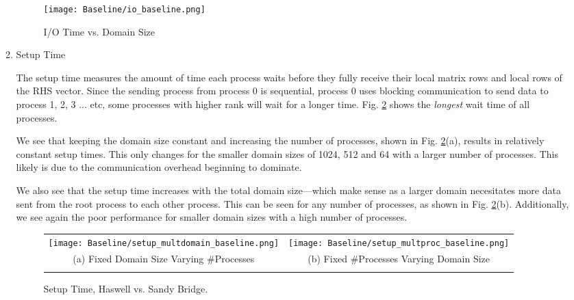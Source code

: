\begin{enumerate}
\begin{enumerate}
	
 \begin{figure}[h] %
 	\begin{center}
  		\texttt{[image: Baseline/io\_baseline.png]} %
  		\caption{I/O Time vs. Domain Size}
  		\label{fig:IO}
  	\end{center}
 \end{figure}

	\item Setup Time

	The setup time measures the amount of time each process waits before they fully receive their local matrix rows and local rows of the RHS vector. Since the sending process from process 0 is sequential, process 0 uses blocking communication to send data to process 1, 2, 3 ... etc, some processes with higher rank will wait for a longer time. Fig. \ref{fig:setup} shows the \textit{longest} wait time of all processes. 
	
	We see that keeping the domain size constant and increasing the number of processes, shown in Fig. \ref{fig:setup}(a), results in relatively constant setup times. This only changes for the smaller domain sizes of 1024, 512 and 64 with a larger number of processes. This likely is due to the communication overhead beginning to dominate.
	
 We also see that the setup time increases with the total domain size---which make sense as a larger domain necesitates more data sent from the root process to each other process. This can be seen for any number of processes, as shown in Fig. \ref{fig:setup}(b). Additionally, we see again the poor performance for smaller domain sizes with a high number of processes.
	
	
	\begin{figure}[h] %
		\begin{tabular}{cc}
			\hspace*{-0.35\linewidth}\texttt{[image: Baseline/setup\_multdomain\_baseline.png]} & \hspace*{-0.05\linewidth}\texttt{[image: Baseline/setup\_multproc\_baseline.png]} \\
		    \hspace*{-0.45\linewidth}(a) Fixed Domain Size Varying \#Processes & \hspace*{-0.15\linewidth}(b) Fixed \#Processes Varying Domain Size\\[6pt]\\
		\end{tabular}
		\caption{Setup Time, Haswell vs. Sandy Bridge.}
		\label{fig:setup}
	\end{figure}
	

\end{enumerate}
\end{enumerate}
